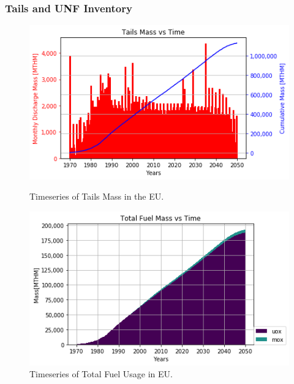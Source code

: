 \begin{frame}
	\frametitle{Tails and UNF Inventory}
\begin{figure}[htbp!]
\begin{minipage}[b]{.45\linewidth}
	\begin{center}
		\includegraphics[width=\textwidth]{./images/eu_future/tails.png}
	\end{center}
	\caption{Timeseries of Tails Mass in the \gls{EU}.}
	\label{fig:eu_tail}
\end{minipage}
\hspace{.5cm}
\begin{minipage}[b]{.45\linewidth}
	\centering
	\includegraphics[width=\textwidth]{./images/eu_future/total_fuel.png}
	\caption{Timeseries of Total Fuel Usage in \gls{EU}.}
	\label{fig:eu_fuel}
\end{minipage}
\end{figure}
\end{frame}

